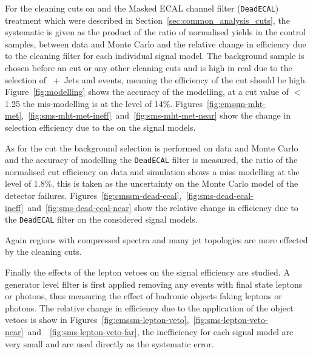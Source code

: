 For the cleaning cuts on \Rmiss and the Masked ECAL channel filter (\texttt{DeadECAL}) treatment which were described in Section~\ref{sec:common_analysis_cuts}, the systematic is given as the product of the ratio of normalised yields in the control samples, between data and Monte Carlo and the relative change in efficiency due to the cleaning filter for each individual signal model. The background sample is chosen before an \alt cut or any other cleaning cuts and is high in real \MET due to the selection of \HepProcess{\PW}~+~Jets and \HepProcess{\Ptop\APtop} events, meaning the efficiency of the \Rmiss cut should be high. Figure~\ref{fig:modelling} shows the accuracy of the \Rmiss modelling, at a cut value of \Rmiss $<$ 1.25 the mis-modelling is at the level of 14$\%$. Figures~\ref{fig:cmssm-mht-met},~\ref{fig:sms-mht-met-ineff}~and~\ref{fig:sms-mht-met-near} show the change in selection efficiency due to the \Rmiss on the signal models.

As for the \Rmiss cut the background selection is performed on data and 
Monte Carlo and the accuracy of modelling the \texttt{DeadECAL} filter is 
measured, the ratio of the normalised cut efficiency on data and simulation 
shows a miss modelling at the level of 1.8$\%$, this is taken as the 
uncertainty on the Monte Carlo model of the detector failures. 
Figures~\ref{fig:cmssm-dead-ecal},~\ref{fig:sms-dead-ecal-ineff}~and~\ref{fig:sms-dead-ecal-near} show the relative change in efficiency due to the 
\texttt{DeadECAL} filter on the considered signal models.

Again regions with compressed spectra and many jet topologies are more effected 
by the cleaning cuts.

Finally the effects of the lepton vetoes on the signal efficiency are studied. 
A generator level filter is first applied removing any events with final state 
leptons or photons, thus measuring the effect of hadronic objects faking 
leptons or photons. The relative change in efficiency due to the application of 
the object vetoes is show in 
Figures~\ref{fig:cmssm-lepton-veto},~\ref{fig:sms-lepton-veto-near}~and~~\ref{fig:sms-lepton-veto-far}, the inefficiency for each signal model are very small 
and are used directly as the systematic error.


